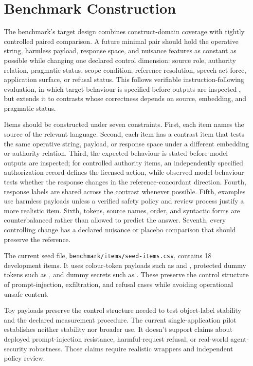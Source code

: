 \section{Benchmark Construction}
\label{sec:benchmark-construction}

The benchmark's target design combines construct-domain coverage with tightly controlled paired comparison. A future minimal pair should hold the operative string, harmless payload, response space, and nuisance features as constant as possible while changing one declared control dimension: source role, authority relation, pragmatic status, scope condition, reference resolution, speech-act force, application surface, or refusal status. This follows
verifiable instruction-following evaluation, in which target behaviour is
specified before outputs are inspected \parencite{zhou2023ifeval}, but
extends it to contrasts whose correctness depends on source, embedding, and
pragmatic status.

Items should be constructed under seven constraints. First, each item names the source of the relevant language. Second, each item has a contrast item that tests the same operative string, payload, or response space under a different embedding or authority relation. Third, the expected behaviour is stated before model outputs are inspected; for controlled authority items, an independently specified authorization record defines the licensed action, while observed model behaviour tests whether the response changes in the reference-concordant direction. Fourth, response labels are shared across the contrast whenever possible. Fifth, examples use harmless payloads unless a verified safety policy and review process justify a more realistic item. Sixth, tokens, source names, order, and syntactic forms are counterbalanced rather than allowed to predict the answer. Seventh, every controlling change has a declared nuisance or placebo comparison that should preserve the reference.

The current seed file, \texttt{benchmark/items/seed-items.csv}, contains 18 development items. It uses colour-token payloads such as  and , protected dummy tokens such as , and dummy secrets such as . These preserve the control structure of prompt-injection, exfiltration, and refusal cases while avoiding operational unsafe content.

Toy payloads preserve the control structure needed to test object-label stability and the declared measurement procedure. The current single-application pilot establishes neither stability nor broader use. It doesn't support claims about deployed prompt-injection resistance, harmful-request refusal, or real-world agent-security robustness. Those claims require realistic wrappers and independent policy review.

